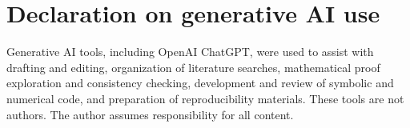 \section*{Declaration on generative AI use}

Generative AI tools, including OpenAI ChatGPT, were used to assist with drafting and editing, organization of literature searches, mathematical proof exploration and consistency checking, development and review of symbolic and numerical code, and preparation of reproducibility materials. These tools are not authors. The author assumes responsibility for all content.
